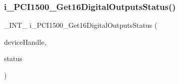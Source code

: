 \subsubsection{\texorpdfstring{i\_PCI1500\_Get16DigitalOutputsStatus()}{i\_PCI1500\_Get16DigitalOutputsStatus()}}
{\footnotesize\ttfamily \+\_\+\+I\+N\+T\+\_\+ i\+\_\+\+P\+C\+I1500\+\_\+\+Get16\+Digital\+Outputs\+Status (\begin{DoxyParamCaption}\item[{H\+A\+N\+D\+LE}]{device\+Handle,  }\item[{P\+W\+O\+RD}]{status }\end{DoxyParamCaption})}

